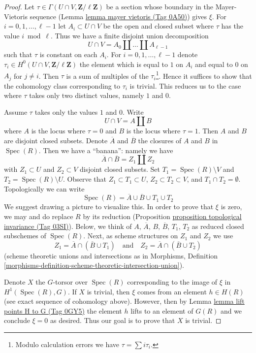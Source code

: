 \documentclass{amsart}
\theoremstyle{plain}
\theoremstyle{definition}
\theoremstyle{remark}
\numberwithin{equation}{subsection}
\def\Spec{\mathop{\mathrm{Spec}}}
\begin{document}
\begin{proof}
\medskip\noindent
Let $\tau \in \Gamma(U \cap V, \mathbf{Z}/\ell\mathbf{Z})$
be a section whose boundary in the Mayer-Vietoris sequence
(Lemma \href{https://stacks.math.columbia.edu/tag/0A50}{lemma mayer vietoris (Tag 0A50)}) gives $\xi$.
For $i = 0, 1, \ldots, \ell - 1$ let $A_i \subset U \cap V$
be the open and closed subset where $\tau$ has the value $i \bmod \ell$.
Thus we have a finite disjoint union decomposition
$$
U \cap V = A_0 \amalg \ldots \amalg A_{\ell - 1}
$$
such that $\tau$ is constant on each $A_i$. For
$i = 0, 1, \ldots, \ell - 1$
denote $\tau_i \in H^0(U \cap V, \mathbf{Z}/\ell\mathbf{Z})$
the element which is equal to $1$ on $A_i$ and
equal to $0$ on $A_j$ for $j \not = i$.
Then $\tau$ is a sum of multiples of the $\tau_i$\footnote{Modulo
calculation errors we have $\tau = \sum i \tau_i$.}.
Hence it suffices to show that the cohomology class corresponding
to $\tau_i$ is trivial. This reduces us to the case where
$\tau$ takes only two distinct values, namely $1$ and $0$.

\medskip\noindent
Assume $\tau$ takes only the values $1$ and $0$. Write
$$
U \cap V = A \amalg B
$$
where $A$ is the locus where $\tau = 0$ and $B$ is the locus
where $\tau = 1$. Then $A$ and $B$ are disjoint closed subsets.
Denote $\overline{A}$ and $\overline{B}$ the closures of $A$ and $B$ in
$\Spec(R)$. Then we have a ``banana'': namely
we have
$$
\overline{A} \cap \overline{B} = Z_1 \amalg Z_2
$$
with $Z_1 \subset U$ and $Z_2 \subset V$ disjoint closed subsets.
Set $T_1 = \Spec(R) \setminus V$ and $T_2 = \Spec(R) \setminus U$.
Observe that $Z_1 \subset T_1 \subset U$, $Z_2 \subset T_2 \subset V$, and
$T_1 \cap T_2 = \emptyset$. Topologically we can write
$$
\Spec(R) = \overline{A} \cup \overline{B} \cup T_1 \cup T_2
$$
We suggest drawing a picture to visualize this.
In order to prove that $\xi$ is zero, we may and do replace $R$ by
its reduction (Proposition \href{https://stacks.math.columbia.edu/tag/03SI}{proposition topological invariance (Tag 03SI)}).
Below, we think of $A$, $\overline{A}$, $B$, $\overline{B}$, $T_1$, $T_2$
as reduced closed subschemes of $\Spec(R)$. Next, as scheme structures on $Z_1$
and $Z_2$ we use
$$
Z_1 = \overline{A} \cap (\overline{B} \cup T_1)
\quad\text{and}\quad
Z_2 = \overline{A} \cap (\overline{B} \cup T_2)
$$
(scheme theoretic unions and intersections as in Morphisms, Definition
\ref{morphisms-definition-scheme-theoretic-intersection-union}).

\medskip\noindent
Denote $X$ the $G$-torsor over $\Spec(R)$ corresponding to the image
of $\xi$ in $H^1(\Spec(R), G)$. If $X$ is trivial, then $\xi$
comes from an element $h \in H(R)$ (see exact sequence of cohomology
above). However, then by Lemma \href{https://stacks.math.columbia.edu/tag/0GY5}{lemma lift points H to G (Tag 0GY5)}
the element $h$ lifts to an element of $G(R)$ and we conclude
$\xi = 0$ as desired. Thus our goal is to prove that $X$ is trivial.


\end{proof}
\end{document}
